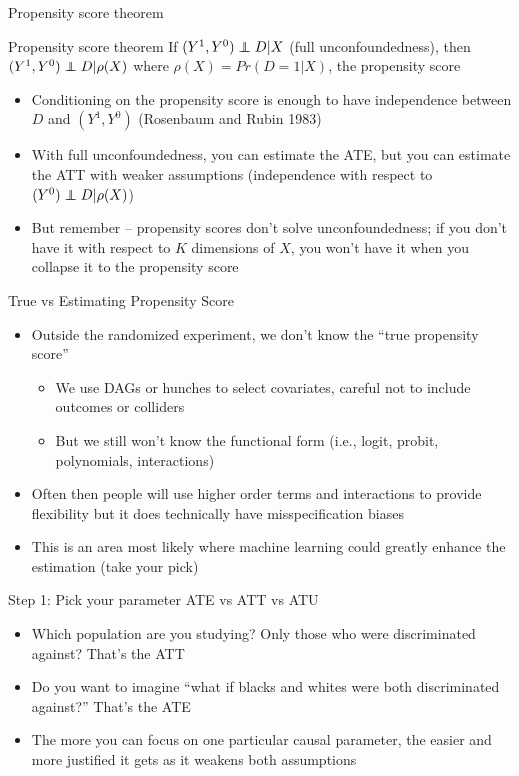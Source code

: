 \documentclass{beamer}
\newcommand\independent{\protect\mathpalette{\protect\independenT}{\perp}}
\def\independenT#1#2{\mathrel{\rlap{$#1#2$}\mkern2mu{#1#2}}}
\begin{document}
\begin{frame}{Propensity score theorem}
	
	\begin{block}{Propensity score theorem}
	If $(Y^1,Y^0)\independent{D}|X$ (full unconfoundedness), then $(Y^1,Y^0)\independent{D} | \rho(X)$ where $\rho(X)=Pr(D=1|X)$, the propensity score
	\end{block}
	
	\begin{itemize}
	\item Conditioning on the propensity score is enough to have independence between $D$ and $(Y^1,Y^0)$ (Rosenbaum and Rubin 1983)
	\item With full unconfoundedness, you can estimate the ATE, but you can estimate the ATT with weaker assumptions (independence with respect to $(Y^0)\independent{D} | \rho(X)$)
	\item But remember -- propensity scores don't solve unconfoundedness; if you don't have it with respect to $K$ dimensions of $X$, you won't have it when you collapse it to the propensity score
	\end{itemize}
\end{frame}

\begin{frame}{True vs Estimating Propensity Score}


\begin{itemize}
\item Outside the randomized experiment, we don't know the ``true propensity score''
	\begin{itemize}
	\item We use DAGs or hunches to select covariates, careful not to include outcomes or colliders
	\item But we still won't know the functional form (i.e., logit, probit, polynomials, interactions)
	\end{itemize}
\item Often then people will use higher order terms and interactions to provide flexibility but it does technically have misspecification biases
\item This is an area most likely where machine learning could greatly enhance the estimation (take your pick)
\end{itemize}

\end{frame}




\begin{frame}{Step 1: Pick your parameter ATE vs ATT vs ATU}

\begin{itemize}
	\item Which population are you studying?  Only those who were discriminated against?  That's the ATT
	\item Do you want to imagine ``what if blacks and whites were both discriminated against?'' That's the ATE
	\item The more you can focus on one particular causal parameter, the easier and more justified it gets as it weakens both assumptions
\end{itemize}

\end{frame}
\end{document}
